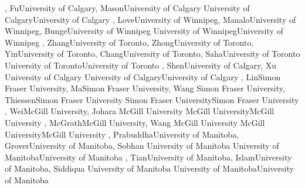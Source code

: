 {
,  {Fu}{University of Calgary},  {Mason}{University of Calgary}
}
{University of Calgary}{University of Calgary}
{\bubbleE \enspace \screenE}
{
,  {Love}{University of Winnipeg},  {Manalo}{University of Winnipeg},  {Bunge}{University of Winnipeg}
}
{University of Winnipeg}{University of Winnipeg}
{\bubbleE \enspace \screenE}
{
,  {Zhang}{University of Toronto},  {Zhong}{University of Toronto},  {Yin}{University of Toronto},  {Chang}{University of Toronto},  {Saha}{University of Toronto}
}
{University of Toronto}{University of Toronto}
{\bubbleE \enspace \screenE}
{
,  {Shen}{University of Calgary},  {Xu}
{University of Calgary}
}
{University of Calgary}{University of Calgary}
{\bubbleE \enspace \screenE}
{
,  {Lin}{Simon Fraser University},  {Ma}{Simon Fraser University},  {Wang}
{Simon Fraser University},  {Thiessen}{Simon Fraser University}
}
{Simon Fraser University}{Simon Fraser University}
{\bubbleE \enspace \screenE}
{
,  {Wei}{McGill University},  {Johara}
{McGill University}
}
{McGill University}{McGill University}
{\bubbleE \enspace \screenE}
{
,  {McGrath}{McGill University},  {Wang}
{McGill University}
}
{McGill University}{McGill University}
{\bubbleE \enspace \screenE}
{
,  {Prabuddha}{University of Manitoba},  {Grover}{University of Manitoba},  {Sobhan}
{University of Manitoba}
}
{University of Manitoba}{University of Manitoba}
{\bubbleE \enspace \screenE}
{
,  {Tian}{University of Manitoba},  {Islam}{University of Manitoba},  {Siddiqua}
{University of Manitoba}
}
{University of Manitoba}{University of Manitoba}
{\bubbleE \enspace \screenE}

